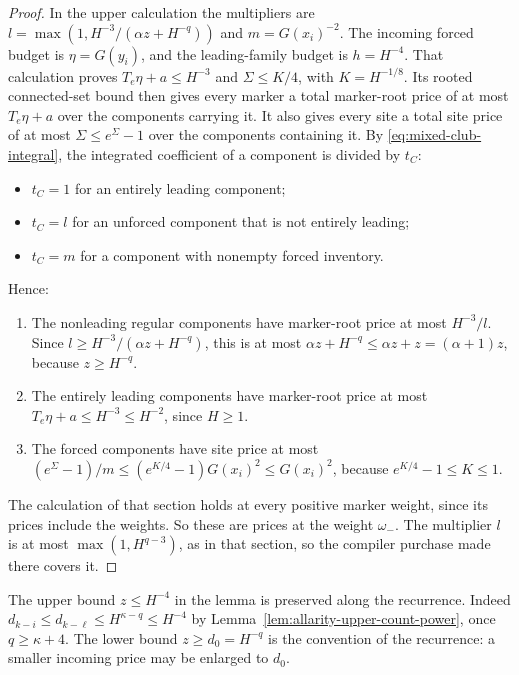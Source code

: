 \begin{proof}
In the upper calculation the multipliers are
$l=\max(1,H^{-3}/(\alpha z+H^{-q}))$ and $m=G(x_i)^{-2}$. The incoming
forced budget is $\eta=G(y_i)$, and the leading-family budget is
$h=H^{-4}$. That calculation proves $T_e\eta+a\le H^{-3}$ and
$\Sigma\le K/4$, with $K=H^{-1/8}$. Its rooted connected-set bound then
gives every marker a total marker-root price of at most $T_e\eta+a$ over
the components carrying it. It also gives every site a total site price
of at most $\Sigma\le e^{\Sigma}-1$ over the components containing it.
By \eqref{eq:mixed-club-integral}, the integrated coefficient of a
component is divided by $t_C$:
\begin{itemize}
\item $t_C=1$ for an entirely leading component;
\item $t_C=l$ for an unforced component that is not entirely leading;
\item $t_C=m$ for a component with nonempty forced inventory.
\end{itemize}
Hence:
\begin{enumerate}
\item The nonleading regular components have marker-root price at most
 $H^{-3}/l$. Since $l\ge H^{-3}/(\alpha z+H^{-q})$, this is at most
 $\alpha z+H^{-q}\le\alpha z+z=(\alpha+1)z$, because $z\ge H^{-q}$.
\item The entirely leading components have marker-root price at most
 $T_e\eta+a\le H^{-3}\le H^{-2}$, since $H\ge1$.
\item The forced components have site price at most
 $(e^\Sigma-1)/m\le(e^{K/4}-1)G(x_i)^2\le G(x_i)^2$, because
 $e^{K/4}-1\le K\le1$.
\end{enumerate}
The calculation of that section holds at every positive marker weight,
since its prices include the weights. So these are prices at the weight
$\omega_-$. The multiplier $l$ is at most $\max(1,H^{q-3})$, as in that
section, so the compiler purchase made there covers it.
\end{proof}

The upper bound $z\le H^{-4}$ in the lemma is preserved along the
recurrence. Indeed $d_{k-i}\le d_{k-\ell}\le H^{\kappa-q}\le H^{-4}$ by
Lemma~\ref{lem:allarity-upper-count-power}, once $q\ge\kappa+4$. The
lower bound $z\ge d_0=H^{-q}$ is the convention of the recurrence: a
smaller incoming price may be enlarged to $d_0$.

